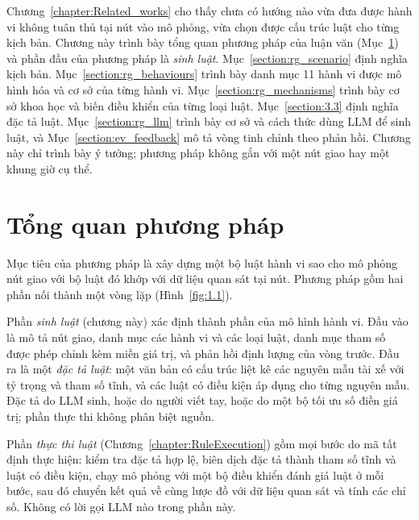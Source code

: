 \documentclass[../main.tex]{subfiles}
\begin{document}

Chương~\ref{chapter:Related_works} cho thấy chưa có hướng nào vừa đưa được hành vi không tuân thủ tại nút vào mô phỏng, vừa chọn được cấu trúc luật cho từng kịch bản. Chương này trình bày tổng quan phương pháp của luận văn (Mục~\ref{section:3.1}) và phần đầu của phương pháp là \emph{sinh luật}. Mục~\ref{section:rg_scenario} định nghĩa kịch bản. Mục~\ref{section:rg_behaviours} trình bày danh mục 11 hành vi được mô hình hóa và cơ sở của từng hành vi. Mục~\ref{section:rg_mechanisms} trình bày cơ sở khoa học và biến điều khiển của từng loại luật. Mục~\ref{section:3.3} định nghĩa đặc tả luật. Mục~\ref{section:rg_llm} trình bày cơ sở và cách thức dùng LLM để sinh luật, và Mục~\ref{section:ev_feedback} mô tả vòng tinh chỉnh theo phản hồi. Chương này chỉ trình bày ý tưởng; phương pháp không gắn với một nút giao hay một khung giờ cụ thể.

\section{Tổng quan phương pháp}
\label{section:3.1}

Mục tiêu của phương pháp là xây dựng một bộ luật hành vi sao cho mô phỏng nút giao với bộ luật đó khớp với dữ liệu quan sát tại nút. Phương pháp gồm hai phần nối thành một vòng lặp (Hình~\ref{fig:1.1}).

Phần \emph{sinh luật} (chương này) xác định thành phần của mô hình hành vi. Đầu vào là mô tả nút giao, danh mục các hành vi và các loại luật, danh mục tham số được phép chỉnh kèm miền giá trị, và phản hồi định lượng của vòng trước. Đầu ra là một \emph{đặc tả luật}: một văn bản có cấu trúc liệt kê các nguyên mẫu tài xế với tỷ trọng và tham số tĩnh, và các luật có điều kiện áp dụng cho từng nguyên mẫu. Đặc tả do LLM sinh, hoặc do người viết tay, hoặc do một bộ tối ưu số điền giá trị; phần thực thi không phân biệt nguồn.

Phần \emph{thực thi luật} (Chương~\ref{chapter:RuleExecution}) gồm mọi bước do mã tất định thực hiện: kiểm tra đặc tả hợp lệ, biên dịch đặc tả thành tham số tĩnh và luật có điều kiện, chạy mô phỏng với một bộ điều khiển đánh giá luật ở mỗi bước, sau đó chuyển kết quả về cùng lược đồ với dữ liệu quan sát và tính các chỉ số. Không có lời gọi LLM nào trong phần này.
\end{document}
